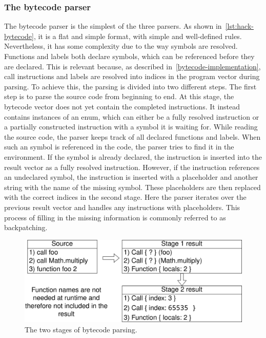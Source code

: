 \subsubsection{The bytecode parser} \label{bytecode-parser}
The bytecode parser is the simplest of the three parsers.
As shown in~\cref{lst:hack-bytecode}, it is a flat and simple format, with simple and well-defined rules.
Nevertheless, it has some complexity due to the way symbols are resolved.
Functions and labels both declare symbols, which can be referenced before they are declared.
This is relevant because, as described in~\cref{bytecode-implementation}, call instructions and labels are resolved into indices in the program vector during parsing.
To achieve this, the parsing is divided into two different steps.
The first step is to parse the source code from beginning to end.
At this stage, the bytecode vector does not yet contain the completed instructions.
It instead contains instances of an enum, which can either be a fully resolved instruction or a partially constructed instruction with a symbol it is waiting for.
While reading the source code, the parser keeps track of all declared functions and labels.
When such an symbol is referenced in the code, the parser tries to find it in the environment.
If the symbol is already declared, the instruction is inserted into the result vector as a fully resolved instruction.
However, if the instruction references an undeclared symbol, the instruction is inserted with a placeholder and another string with the name of the missing symbol.
These placeholders are then replaced with the correct indices in the second stage.
Here the parser iterates over the previous result vector and handles any instructions with placeholders.
This process of filling in the missing information is commonly referred to as backpatching.
\begin{center}
  \begin{figure}[ht]
    \centering
    \includegraphics[width=12cm]{fig/bytecode-parsing.png}
    \caption{The two stages of bytecode parsing.}
    \label{fig:bytecode-parsing}
  \end{figure}
\end{center}
